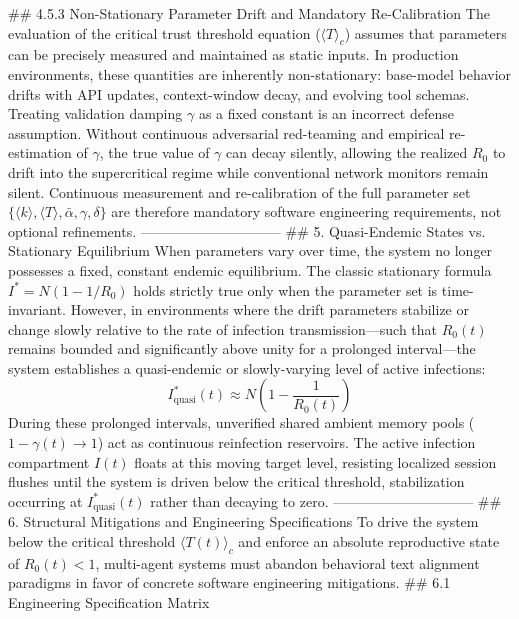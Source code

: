 ## 4.5.3 Non-Stationary Parameter Drift and Mandatory Re-Calibration
The evaluation of the critical trust threshold equation ($\langle T \rangle_c$) assumes that parameters can be precisely measured and maintained as static inputs.
In production environments, these quantities are inherently non-stationary: base-model behavior drifts with API updates, context-window decay, and evolving tool schemas. Treating validation damping $\gamma$ as a fixed constant is an incorrect defense assumption. Without continuous adversarial red-teaming and empirical re-estimation of $\gamma$, the true value of $\gamma$ can decay silently, allowing the realized $R_0$ to drift into the supercritical regime while conventional network monitors remain silent. Continuous measurement and re-calibration of the full parameter set $\{\langle k \rangle, \langle T \rangle, \bar{\alpha}, \gamma, \delta\}$ are therefore mandatory software engineering requirements, not optional refinements.
------------------------------
## 5. Quasi-Endemic States vs. Stationary Equilibrium
When parameters vary over time, the system no longer possesses a fixed, constant endemic equilibrium. The classic stationary formula $I^* = N(1 - 1/R_0)$ holds strictly true only when the parameter set is time-invariant. However, in environments where the drift parameters stabilize or change slowly relative to the rate of infection transmission—such that $R_0(t)$ remains bounded and significantly above unity for a prolonged interval—the system establishes a quasi-endemic or slowly-varying level of active infections:
$$I_{\text{quasi}}^*(t) \approx N \left(1 - \frac{1}{R_0(t)}\right)$$ 
During these prolonged intervals, unverified shared ambient memory pools ($1 - \gamma(t) \to 1$) act as continuous reinfection reservoirs. The active infection compartment $I(t)$ floats at this moving target level, resisting localized session flushes until the system is driven below the critical threshold, stabilization occurring at $I_{\text{quasi}}^*(t)$ rather than decaying to zero.
------------------------------
## 6. Structural Mitigations and Engineering Specifications
To drive the system below the critical threshold $\langle T(t) \rangle_c$ and enforce an absolute reproductive state of $R_0(t) < 1$, multi-agent systems must abandon behavioral text alignment paradigms in favor of concrete software engineering mitigations.
## 6.1 Engineering Specification Matrix

